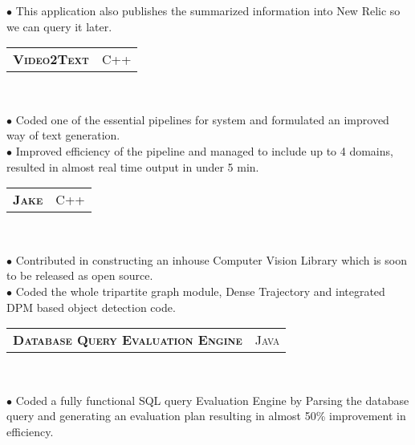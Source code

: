 \documentclass[10pt,a4paper,oneside]{article}
\begin{document}
\begin{minipage}[t]{0.63\textwidth}
\begin{adjustwidth}{7pt}{0pt}
{            $\bullet$ This application also publishes the summarized information into New Relic so we can query it later.}\\
        \end{adjustwidth}
        \begin{tabular}{c|c}
            \textbf{\normalsize V\textsc{ideo}2T\textsc{ext}}
            &\textmd{\normalsize C\textsc{++}}
        \end{tabular}\\
        \vspace{-4mm}
        \begin{adjustwidth}{7pt}{0pt}
            {\footnotesize $\bullet$ Coded one of the essential pipelines for system and formulated an improved way of text generation.\\
            $\bullet$ Improved efficiency of the pipeline and managed to include up to 4 domains, resulted in almost real time output in
        under 5 min.}\\ 
        \end{adjustwidth}
        \begin{tabular}{c|c}
            \textbf{\normalsize J\textsc{ake}}
            &\textmd{\normalsize C\textsc{++}}
        \end{tabular}\\
         \vspace{-4mm}
        \begin{adjustwidth}{7pt}{0pt}
            {\footnotesize $\bullet$ Contributed in constructing an inhouse Computer Vision Library which is soon to be released as open
                source.\\
            $\bullet$ Coded the whole tripartite graph module, Dense Trajectory and integrated DPM based object detection code.}\\
        \end{adjustwidth}
        \begin{tabular}{c|c}
            \textbf{\normalsize D\textsc{atabase} Q\textsc{uery}
            E\textsc{valuation} E\textsc{ngine}}
            &\textmd{\normalsize J\textsc{ava}}
        \end{tabular}\\
         \vspace{-4mm}
        \begin{adjustwidth}{7pt}{0pt}
            {\footnotesize $\bullet$ Coded a fully functional SQL query Evaluation Engine by Parsing the database query and generating an evaluation plan resulting in almost
            50\% improvement in efficiency.}\\
        \end{adjustwidth}
   \end{minipage}
\end{document}
